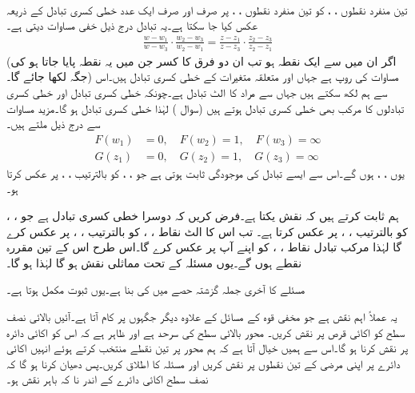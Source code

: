 \quad {}\\
تین منفرد نقطوں ، ،  کو تین منفرد نقطوں ، ،  پر صرف اور صرف ایک عدد خطی کسری تبادل  کے ذریعہ عکس کیا جا سکتا ہے۔یہ تبادل درج ذیل خفی مساوات دیتی ہے۔
\begin{align}\label{مساوات_نقش_کا_حصول}
\frac{w-w_1}{w-w_3}\cdot \frac{w_2-w_3}{w_2-w_1}=\frac{z-z_1}{z-z_3}\cdot \frac{z_2-z_3}{z_2-z_1}
\end{align}
(اگر ان میں سے ایک نقطہ  ہو تب ان دو فرق کا کسر جن میں یہ نقطہ پایا جاتا ہو کی جگہ  لکھا جائے گا۔)
\quad
مساوات  کی روپ   ہے جہاں  اور  متعلقہ متغیرات کے خطی کسری تبادل ہیں۔اس سے ہم  لکھ سکتے ہیں جہاں  سے مراد  کا الٹ تبادل ہے۔چونکہ خطی کسری تبادل اور خطی کسری تبادلوں کا مرکب بھی خطی کسری تبادل ہوتے ہیں (سوال ) لہٰذا  خطی کسری تبادل ہو گا۔مزید مساوات  سے درج ذیل ملتے ہیں۔
\begin{align*}
F(w_1)&=0,\quad F(w_2)=1,\quad F(w_3)=\infty\\
G(z_1)&=0,\quad G(z_2)=1,\quad G(z_3)=\infty
\end{align*}
یوں ، ،  ہوں گے۔اس سے  ایسے تبادل  کی موجودگی ثابت ہوتی ہے جو ، ،  کو بالترتیب  ، ،  پر عکس کرتا ہو۔ 

ہم ثابت کرتے ہیں کہ نقش  یکتا ہے۔فرض کریں کہ   دوسرا خطی کسری تبادل ہے جو  ، ،  کو بالترتیب  ، ،  پر عکس کرتا ہے۔ تب اس کا الٹ  نقاط ، ،   کو بالترتیب  ، ،  پر عکس کرے گا لہٰذا مرکب تبادل  نقاط ، ،  کو اپنے آپ پر عکس کرے گا۔اس طرح اس کے تین مقررہ نقطے ہوں گے۔یوں مسئلہ  کے تحت  مماثلی نقش ہو گا لہٰذا  ہو گا۔

مسئلے کا آخری جملہ  گزشتہ حصے میں  کی بنا ہے۔یوں ثبوت مکمل ہوتا ہے۔

 یہ عملاً اہم نقش ہے جو  مخفی قوہ کے مسائل کے علاوہ دیگر جگہوں پر کام آتا ہے۔آئیں بالائی نصف سطح  کو اکائی قرص  پر نقش کریں۔  محور بالائی سطح کی سرحد  ہے اور ظاہر ہے کہ اس کو اکائی دائرہ  پر نقش کرنا ہو گا۔اس سے ہمیں خیال آتا ہے کہ ہم  محور پر تین نقطے منتخب کرتے ہوئے  انہیں اکائی دائرے پر  اپنی مرضی کے تین نقطوں پر نقش کریں اور  مسئلہ  کا اطلاق کریں۔پس دھیان کرنا ہو گا کہ نصف سطح  اکائی دائرے کے اندر نا کہ باہر نقش ہو۔

